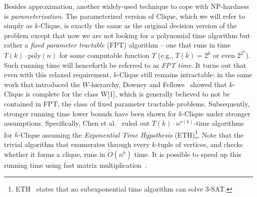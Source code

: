 \documentclass[10pt,a4paper]{article}
\newcommand{\poly}{\text{poly}}
\renewcommand{\tilde}{\widetilde}
\begin{document}
Besides approximation, another widely-used technique to cope with NP-hardness is \emph{parameterization}. The parameterized version of Clique, which we will refer to simply as $k$-Clique, is exactly the same as the original decision version of the problem except that now we are not looking for a polynomial time algorithm but rather a {\em fixed parameter tractable} (FPT) algorithm -- one that runs in time $T(k)\cdot \poly(n)$ for some computable function $T$ (e.g., $T(k) = 2^k$ or even $2^{2^k}$). Such running time will henceforth be referred to as \emph{FPT time}. It turns out that even with this relaxed requirement, $k$-Clique still remains intractable: in the same work that introduced the $W$-hierarchy, Downey and Fellows~\cite{DF95} showed that $k$-Clique is complete for the class W[1], which is generally believed to not be contained in FPT, the class of fixed parameter tractable problems. Subsequently, stronger running time lower bounds have been shown for $k$-Clique under stronger assumptions. Specifically, Chen et al.~\cite{CHKX06a,CHKX06b} ruled out $T(k) \cdot n^{o(k)}$-time algorithms for $k$-Clique assuming the {\em Exponential Time Hypothesis} (ETH)\footnote{ETH~\cite{IP01,IPZ01} states that no subexponential time algorithm can solve 3-SAT.}.  Note that the trivial algorithm that enumerates through every $k$-tuple of vertices, and checks whether it forms a clique, runs in $\tilde{O}(n^{k})$ time. It is possible to speed up this running time using fast matrix multiplication~\cite{NP85,EG04}. 
\end{document}
